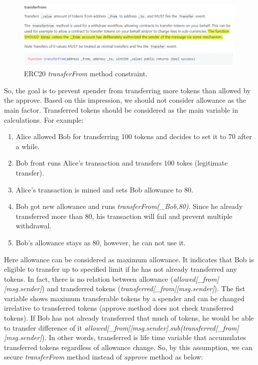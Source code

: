\begin{figure}[H]
	\centering
	\includegraphics[width=1.0\linewidth]{figures/multiple_withdrawal_30.png}
	\caption{ERC20 \textit{transferFrom} method constraint.}
\end{figure}
So, the goal is to prevent spender from transferring more tokens than allowed by the approve. Based on this impression, we should not consider allowance as the main factor. Transferred tokens should be considered as the main variable in calculations. For example:
\begin{enumerate}
	\item Alice allowed Bob for transferring 100 tokens and decides to set it to 70 after a while.
	\item Bob front runs Alice’s transaction and transfers 100 tokes (legitimate transfer).
	\item Alice’s transaction is mined and sets Bob allowance to 80.
	\item Bob got new allowance and runs \textit{transferFrom(\_Bob,80)}. Since he already transferred more than 80, his transaction will fail and prevent multiple withdrawal.
	\item Bob’s allowance stays as 80, however, he can not use it.
\end{enumerate}
Here allowance can be considered as maximum allowance. It indicates that Bob is eligible to transfer up to specified limit if he has not already transferred any tokens. In fact, there is no relation between allowance (\textit{allowed[\_from][msg.sender]}) and transferred tokens (\textit{transferred[\_from][msg.sender]}). The fist variable shows maximum transferable tokens by a spender and can be changed irrelative to transferred tokens (approve method does not check transferred tokens). If Bob has not already transferred that much of tokens, he would be able to transfer difference of it \textit{allowed[\_from][msg.sender].sub(transferred[\_from][msg.sender]}). In other words, transferred is life time variable that accumulates transferred tokens regardless of allowance change. So, by this assumption, we can secure \textit{transferFrom} method instead of \textit{approve} method as below:
